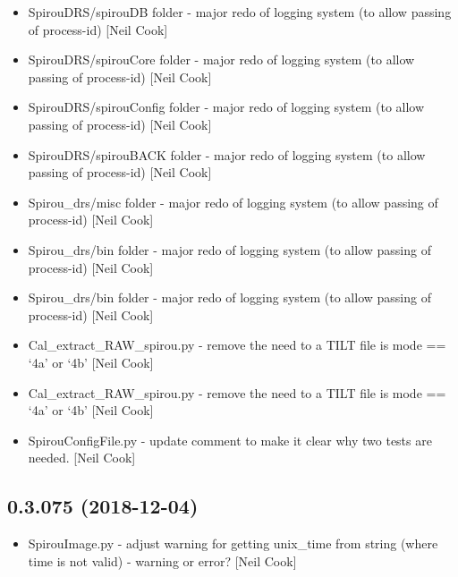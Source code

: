 \documentclass[a4paper,10pt,english]{report}
\begin{document}
\begin{itemize}
\item {} 
SpirouDRS/spirouDB folder - major redo of logging system (to allow
passing of process-id) {[}Neil Cook{]}

\item {} 
SpirouDRS/spirouCore folder - major redo of logging system (to allow
passing of process-id) {[}Neil Cook{]}

\item {} 
SpirouDRS/spirouConfig folder - major redo of logging system (to allow
passing of process-id) {[}Neil Cook{]}

\item {} 
SpirouDRS/spirouBACK folder - major redo of logging system (to allow
passing of process-id) {[}Neil Cook{]}

\item {} 
Spirou\_drs/misc folder - major redo of logging system (to allow
passing of process-id) {[}Neil Cook{]}

\item {} 
Spirou\_drs/bin folder - major redo of logging system (to allow passing
of process-id) {[}Neil Cook{]}

\item {} 
Spirou\_drs/bin folder - major redo of logging system (to allow passing
of process-id) {[}Neil Cook{]}

\item {} 
Cal\_extract\_RAW\_spirou.py - remove the need to a TILT file is mode ==
‘4a’ or ‘4b’ {[}Neil Cook{]}

\item {} 
Cal\_extract\_RAW\_spirou.py - remove the need to a TILT file is mode ==
‘4a’ or ‘4b’ {[}Neil Cook{]}

\item {} 
SpirouConfigFile.py - update comment to make it clear why two tests
are needed. {[}Neil Cook{]}

\end{itemize}


\subsection{0.3.075 (2018-12-04)}
\label{\detokenize{misc/changelog:id246}}\begin{itemize}
\item {} 
SpirouImage.py - adjust warning for getting unix\_time from string
(where time is not valid) - warning or error? {[}Neil Cook{]}

\end{itemize}
\end{document}
